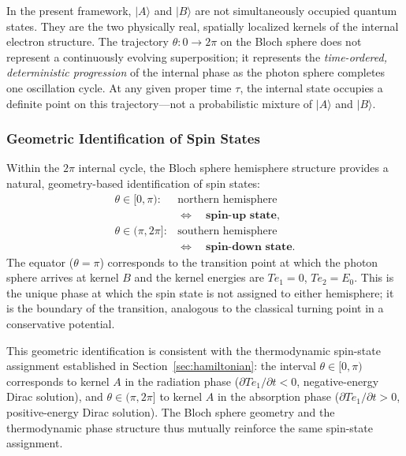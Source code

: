 \documentclass[%
 reprint,
 amsmath,amssymb,
 aps,
 prb,
]{revtex4-2}
\numberwithin{equation}{section}
\theoremstyle{definition}
\theoremstyle{remark}
\begin{document}
In the present framework, $|A\rangle$ and $|B\rangle$ are not simultaneously occupied quantum states. They are the two physically real, spatially localized kernels of the internal electron structure. The trajectory $\theta: 0 \to 2\pi$ on the Bloch sphere does not represent a continuously evolving superposition; it represents the \emph{time-ordered, deterministic progression} of the internal phase as the photon sphere completes one oscillation cycle. At any given proper time $\tau$, the internal state occupies a definite point on this trajectory---not a probabilistic mixture of $|A\rangle$ and $|B\rangle$.

\subsubsection{Geometric Identification of Spin States}

Within the $2\pi$ internal cycle, the Bloch sphere hemisphere structure provides a natural, geometry-based identification of spin states:
\begin{equation}
\begin{array}{rl}
\theta \in [0, \pi): & \text{northern hemisphere} \\
                     & \Leftrightarrow \quad \textbf{spin-up state}, \\[6pt]
\theta \in (\pi, 2\pi]: & \text{southern hemisphere} \\
                        & \Leftrightarrow \quad \textbf{spin-down state}.
\end{array}
\end{equation}
The equator ($\theta = \pi$) corresponds to the transition point at which the photon sphere arrives at kernel $B$ and the kernel energies are $Te_1 = 0$, $Te_2 = E_0$. This is the unique phase at which the spin state is not assigned to either hemisphere; it is the boundary of the transition, analogous to the classical turning point in a conservative potential.

This geometric identification is consistent with the thermodynamic spin-state assignment established in Section~\ref{sec:hamiltonian}: the interval $\theta \in [0, \pi)$ corresponds to kernel $A$ in the radiation phase ($\partial Te_1/\partial t < 0$, negative-energy Dirac solution), and $\theta \in (\pi, 2\pi]$ to kernel $A$ in the absorption phase ($\partial Te_1/\partial t > 0$, positive-energy Dirac solution). The Bloch sphere geometry and the thermodynamic phase structure thus mutually reinforce the same spin-state assignment.
\end{document}
